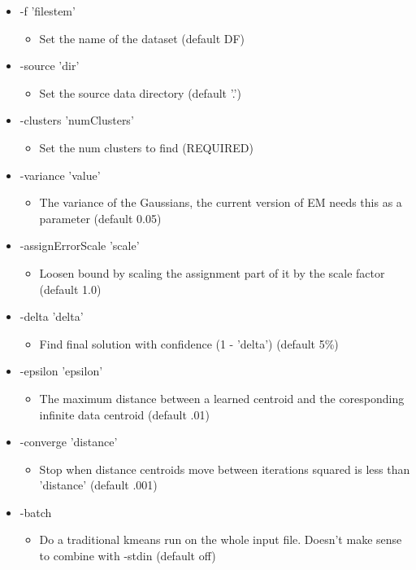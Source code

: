 \begin{itemize}
\item -f 'filestem'\begin{itemize}
\item Set the name of the dataset (default DF)\end{itemize}
\item -source 'dir'\begin{itemize}
\item Set the source data directory (default '.')\end{itemize}
\item -clusters 'num\-Clusters'\begin{itemize}
\item Set the num clusters to find (REQUIRED)\end{itemize}
\item -variance 'value'\begin{itemize}
\item The variance of the Gaussians, the current version of EM needs this as a parameter (default 0.05)\end{itemize}
\item -assign\-Error\-Scale 'scale'\begin{itemize}
\item Loosen bound by scaling the assignment part of it by the scale factor (default 1.0)\end{itemize}
\item -delta 'delta'\begin{itemize}
\item Find final solution with confidence (1 - 'delta') (default 5\%)\end{itemize}
\item -epsilon 'epsilon'\begin{itemize}
\item The maximum distance between a learned centroid and the coresponding infinite data centroid (default .01)\end{itemize}
\item -converge 'distance'\begin{itemize}
\item Stop when distance centroids move between iterations squared is less than 'distance' (default .001)\end{itemize}
\item -batch\begin{itemize}
\item Do a traditional kmeans run on the whole input file. Doesn't make sense to combine with -stdin (default off)\end{itemize}

\end{itemize}
